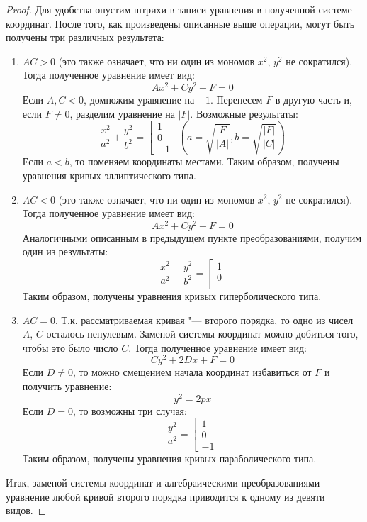\begin{proof}
	Для удобства опустим штрихи в записи уравнения в полученной системе координат. После того, как произведены описанные выше операции, могут быть получены три различных результата:
	\begin{enumerate}
		\item $AC > 0$ (это также означает, что ни один из мономов $x^2$, $y^2$ не сократился). Тогда полученное уравнение имеет вид:
		\[Ax^2 + Cy^2 + F = 0\]
		Если $A, C < 0$, домножим уравнение на $-1$. Перенесем $F$ в другую часть и, если $F \ne 0$, разделим уравнение на $|F|$. Возможные результаты:
		\[\frac{x^2}{a^2} + \frac{y^2}{b^2} = 
		\left[\begin{aligned}
		1\\0\\-1
		\end{aligned}\right.~~\left(a = \sqrt{\frac{|F|}{|A|}}, b = \sqrt{\frac{|F|}{|C|}}\right)
		\]
		Если $a < b$, то поменяем координаты местами. Таким образом, получены уравнения кривых эллиптического типа.
		\item $AC < 0$ (это также означает, что ни один из мономов $x^2$, $y^2$ не сократился). Тогда полученное уравнение имеет вид:
		\[Ax^2 + Cy^2 + F = 0\]
		Аналогичными описанным в предыдущем пункте преобразованиями, получим один из результаты:
		\[\frac{x^2}{a^2} - \frac{y^2}{b^2} = 
		\left[\begin{aligned}
		1\\0\\
		\end{aligned}\right.
		\]
		Таким образом, получены уравнения кривых гиперболического типа.
		\item $AC = 0$. Т.\:к. рассматриваемая кривая "--- второго порядка, то одно из чисел $A$, $C$ осталось ненулевым. Заменой системы координат можно добиться того, чтобы это было число $C$. Тогда полученное уравнение имеет вид:
		\[Cy^2+2Dx+F = 0\]
		Если $D \ne 0$, то можно смещением начала координат избавиться от $F$ и получить уравнение:
		\[y^2 = 2px\]
		Если $D = 0$, то возможны три случая:
		\[\frac{y^2}{a^2} = 
		\left[\begin{aligned}
		1\\0\\-1
		\end{aligned}\right.
		\]
		Таким образом, получены уравнения кривых параболического типа.
	\end{enumerate}
	
	Итак, заменой системы координат и алгебраическими преобразованиями уравнение любой кривой второго порядка приводится к одному из девяти видов.
\end{proof}

